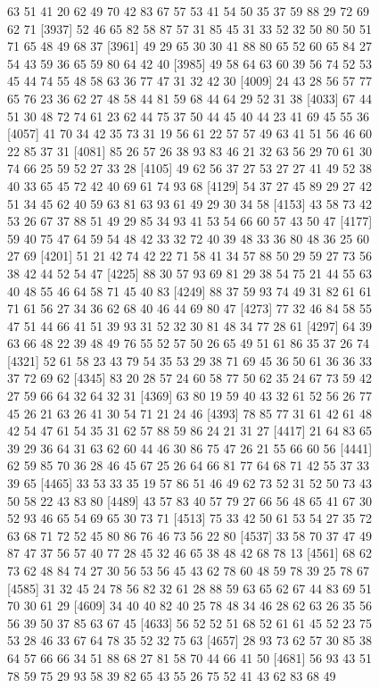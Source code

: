 \documentclass{article}
\begin{document}
\begin{figure}[H]
\begin{Schunk}
\begin{Soutput}
 [3913] 63 51 41 20 62 49 70 42 83 67 57 53 41 54 50 35 37 59 88 29 72 69 62 71
 [3937] 52 46 65 82 58 87 57 31 85 45 31 33 52 32 50 80 50 51 71 65 48 49 68 37
 [3961] 49 29 65 30 30 41 88 80 65 52 60 65 84 27 54 43 59 36 65 59 80 64 42 40
 [3985] 49 58 64 63 60 39 56 74 52 53 45 44 74 55 48 58 63 36 77 47 31 32 42 30
 [4009] 24 43 28 56 57 77 65 76 23 36 62 27 48 58 44 81 59 68 44 64 29 52 31 38
 [4033] 67 44 51 30 48 72 74 61 23 62 44 75 37 50 44 45 40 44 23 41 69 45 55 36
 [4057] 41 70 34 42 35 73 31 19 56 61 22 57 57 49 63 41 51 56 46 60 22 85 37 31
 [4081] 85 26 57 26 38 93 83 46 21 32 63 56 29 70 61 30 74 66 25 59 52 27 33 28
 [4105] 49 62 56 37 27 53 27 27 41 49 52 38 40 33 65 45 72 42 40 69 61 74 93 68
 [4129] 54 37 27 45 89 29 27 42 51 34 45 62 40 59 63 81 63 93 61 49 29 30 34 58
 [4153] 43 58 73 42 53 26 67 37 88 51 49 29 85 34 93 41 53 54 66 60 57 43 50 47
 [4177] 59 40 75 47 64 59 54 48 42 33 32 72 40 39 48 33 36 80 48 36 25 60 27 69
 [4201] 51 21 42 74 42 22 71 58 41 34 57 88 50 29 59 27 73 56 38 42 44 52 54 47
 [4225] 88 30 57 93 69 81 29 38 54 75 21 44 55 63 40 48 55 46 64 58 71 45 40 83
 [4249] 88 37 59 93 74 49 31 82 61 61 71 61 56 27 34 36 62 68 40 46 44 69 80 47
 [4273] 77 32 46 84 58 55 47 51 44 66 41 51 39 93 31 52 32 30 81 48 34 77 28 61
 [4297] 64 39 63 66 48 22 39 48 49 76 55 52 57 50 26 65 49 51 61 86 35 37 26 74
 [4321] 52 61 58 23 43 79 54 35 53 29 38 71 69 45 36 50 61 36 36 33 37 72 69 62
 [4345] 83 20 28 57 24 60 58 77 50 62 35 24 67 73 59 42 27 59 66 64 32 64 32 31
 [4369] 63 80 19 59 40 43 32 61 52 56 26 77 45 26 21 63 26 41 30 54 71 21 24 46
 [4393] 78 85 77 31 61 42 61 48 42 54 47 61 54 35 31 62 57 88 59 86 24 21 31 27
 [4417] 21 64 83 65 39 29 36 64 31 63 62 60 44 46 30 86 75 47 26 21 55 66 60 56
 [4441] 62 59 85 70 36 28 46 45 67 25 26 64 66 81 77 64 68 71 42 55 37 33 39 65
 [4465] 33 53 33 35 19 57 86 51 46 49 62 73 52 31 52 50 73 43 50 58 22 43 83 80
 [4489] 43 57 83 40 57 79 27 66 56 48 65 41 67 30 52 93 46 65 54 69 65 30 73 71
 [4513] 75 33 42 50 61 53 54 27 35 72 63 68 71 72 52 45 80 86 76 46 73 56 22 80
 [4537] 33 58 70 37 47 49 87 47 37 56 57 40 77 28 45 32 46 65 38 48 42 68 78 13
 [4561] 68 62 73 62 48 84 74 27 30 56 53 56 45 43 62 78 60 48 59 78 39 25 78 67
 [4585] 31 32 45 24 78 56 82 32 61 28 88 59 63 65 62 67 44 83 69 51 70 30 61 29
 [4609] 34 40 40 82 40 25 78 48 34 46 28 62 63 26 35 56 56 39 50 37 85 63 67 45
 [4633] 56 52 52 51 68 52 61 61 45 52 23 75 53 28 46 33 67 64 78 35 52 32 75 63
 [4657] 28 93 73 62 57 30 85 38 64 57 66 66 34 51 88 68 27 81 58 70 44 66 41 50
 [4681] 56 93 43 51 78 59 75 29 93 58 39 82 65 43 55 26 75 52 41 43 62 83 68 49

\end{Soutput}
\end{Schunk}
\end{figure}
\end{document}
